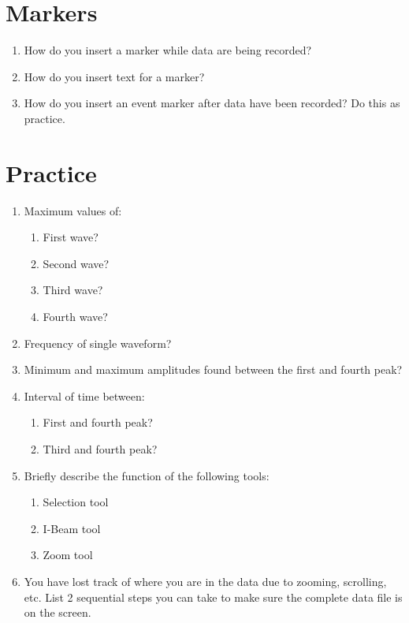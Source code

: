 \documentclass{article}
\begin{document}
\section*{Markers}
\begin{enumerate}
	\item How do you insert a marker while data are being recorded?\vspace{1.5cm}
	\item How do you insert text for a marker?\vspace{1.5cm}
	\item How do you insert an event marker after data have been recorded? Do this as practice.\vspace{2cm}
\end{enumerate}

\section*{Practice}
\begin{enumerate}
			\item Maximum values of:
				\begin{enumerate}
					\item First wave?\vspace{0.5cm}
					\item Second wave?\vspace{0.5cm}
					\item Third wave?\vspace{0.5cm}
					\item Fourth wave?\vspace{0.5cm}
				\end{enumerate}
			\item Frequency of single waveform?\vspace{1cm}
			\item Minimum and maximum amplitudes found between the first and fourth peak?\vspace{1cm}
			\item Interval of time between:
				\begin{enumerate}
					\item First and fourth peak?\vspace{0.5cm}
					\item Third and fourth peak?\vspace{0.5cm}
				\end{enumerate}
			\item Briefly describe the function of the following tools:
				\begin{enumerate}
					\item Selection tool\vspace{1cm}
					\item I-Beam tool\vspace{1cm}
					\item Zoom tool\vspace{1cm}
				\end{enumerate}
			\item You have lost track of where you are in the data due to zooming, scrolling, etc. List 2 sequential steps you can take to make sure the complete data file is on the screen.
		\end{enumerate}
\end{document}

